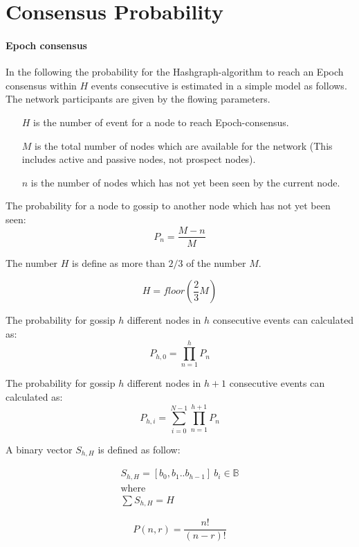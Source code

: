 \section{Consensus Probability}

\paragraph{Epoch consensus}
In the following the probability for the Hashgraph-algorithm to reach an Epoch consensus within $H$ events consecutive is estimated in a simple model as follows.\\

The network participants are given by the flowing parameters.
\begin{itemize}
	\item[$H$] is the number of event for a node to reach Epoch-consensus.
	\item[$M$] is the total number of nodes which are available for the network (This includes active and passive nodes, not prospect nodes). 
	\item[$n$] is the number of nodes which has not yet been seen by the current node. 
\end{itemize}

The probability for a node to gossip to another node which has not yet been seen:
\begin{equation}
P_{n} = \frac{M-n}{M}
\end{equation}

The number $H$ is define as more than $2/3$ of the number $M$.

\begin{equation}
H = floor \left( \frac{2}{3} M \right)
\end{equation}

The probability for gossip $h$ different nodes in $h$ consecutive events can calculated as:
\begin{equation}
P_{h,0} = \prod _{n=1}^{h} P_n
\end{equation}


The probability for gossip $h$ different nodes in $h+1$ consecutive events can calculated as:
\begin{equation}
P_{h,i} = \sum_{i=0}^{N-1} \prod _{n=1}^{h+1} P_n
\end{equation}

A binary vector $S_{h,H}$ is defined as follow:

\begin{align}
S_{h,H} = [b_{0}, b_{1} .. b_{h-1}] ~ b_{i} \in \mathbb{B}\\
\text{where}\\
\sum S_{h,H} = H
\end{align}




\begin{equation}
P(n,r) = \frac{n!}{(n-r)!}
\end{equation}
